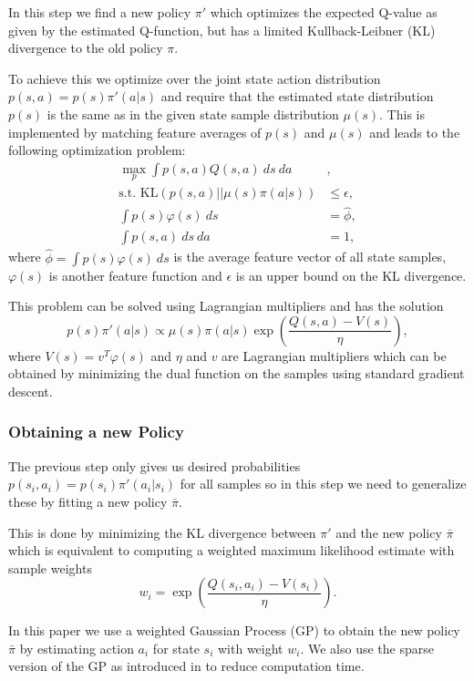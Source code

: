 \documentclass[twoside]{article}
\begin{document}
In this step we find a new policy $\pi'$ which optimizes the expected Q-value
as given by the estimated Q-function, but has a limited Kullback-Leibner (KL)
divergence to the old policy $\pi$.

To achieve this we optimize over the joint state action distribution
$p(s,a) = p(s) \pi'(a|s)$ and require that the estimated state distribution
$p(s)$ is the same as in the given state sample distribution $\mu(s)$.
This is implemented by matching feature averages of $p(s)$ and $\mu(s)$ and
leads to the following optimization problem:
\begin{align*}
    \max_p \int p(s, a)Q(s, a)\:ds\:da\:&, \\
    \text{s.t. } \text{KL}(p(s, a) || \mu(s)\pi(a|s)) &\leq \epsilon,\\
    \int p(s)\varphi(s)\:ds &= \hat{\phi},\\
    \int p(s, a)\:ds\:da &= 1,
\end{align*}
where $\hat{\phi} = \int p(s) \varphi(s)\:ds$ is the average feature vector of all
state samples, $\varphi(s)$ is another feature function and $\epsilon$ is an
upper bound on the KL divergence.

This problem can be solved using Lagrangian multipliers and has the solution
$$
p(s)\pi'(a|s) \propto \mu(s) \pi(a|s) \exp\left(\frac{Q(s,a) - V(s)}{\eta}\right),
$$
where $V(s) = v^T \varphi(s)$ and $\eta$ and $v$ are Lagrangian multipliers which
can be obtained by minimizing the dual function on the samples using standard
gradient descent.

\subsubsection{Obtaining a new Policy}
\label{sec:gp}

The previous step only gives us desired probabilities
$p(s_i, a_i) = p(s_i) \pi'(a_i|s_i)$ for all samples so in this step we need
to generalize these by fitting a new policy $\bar{\pi}$.

This is done by minimizing the KL divergence between $\pi'$ and the new policy
$\bar{\pi}$ which is equivalent to computing a weighted maximum likelihood
estimate with sample weights
$$ w_i = \exp\left(\frac{Q(s_i, a_i) - V(s_i)}{\eta}\right). $$

In this paper we use a weighted Gaussian Process (GP) to obtain the new policy
$\bar{\pi}$ by estimating action $a_i$ for state $s_i$ with weight $w_i$. We
also use the sparse version of the GP as introduced in \cite{sparsegp} to reduce
computation time.
\end{document}
